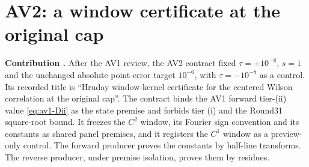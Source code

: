 \section{AV2: a window certificate at the original cap}
\label{sec:av2}

\textbf{Contribution .} After the AV1 review, the AV2
contract fixed $\tau=+10^{-8}$, $s=1$ and the unchanged absolute point-error
target $10^{-6}$, with $\tau=-10^{-8}$ as a control. Its recorded title is
``Hruday window-kernel certificate for the centered Wilson correlation at the
original cap''. The contract binds the AV1 forward tier-(ii) value
\eqref{eq:av1-Dii} as the state premise and forbids tier (i) and the Round31
square-root bound. It freezes the $C^2$ window, its Fourier sign convention
and its constants as shared panel premises, and it registers the $C^1$ window
as a preview-only control. The forward producer proves the constants by
half-line transforms. The reverse producer, under premise isolation, proves
them by residues.

